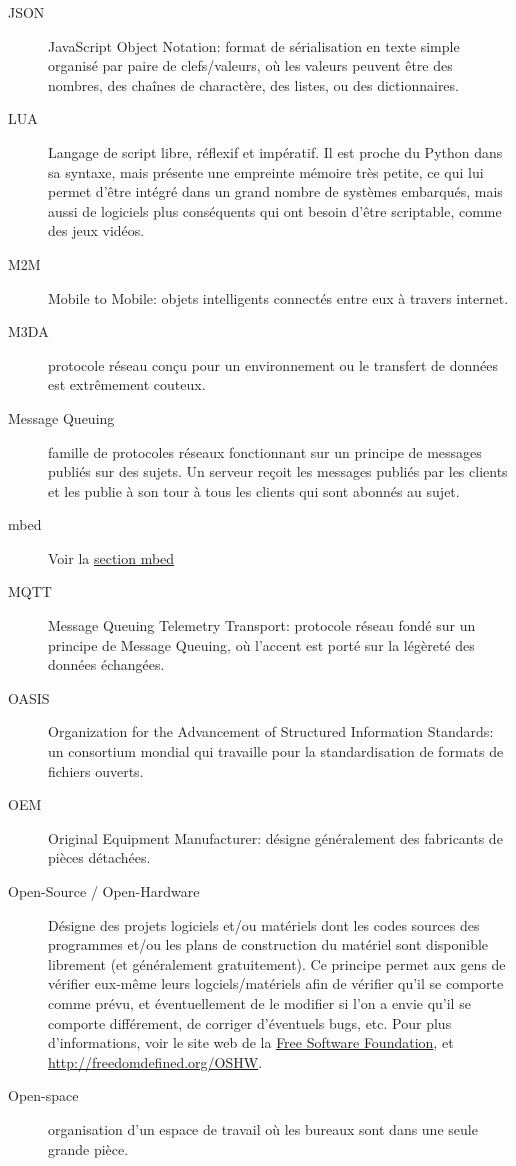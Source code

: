 \documentclass{article}
\begin{document}
\begin{description}
    \item[JSON] JavaScript Object Notation: format de sérialisation en texte simple organisé par paire de clefs/valeurs, où les valeurs peuvent être des nombres, des chaînes de charactère, des listes, ou des dictionnaires.
    \item[LUA] Langage de script libre, réflexif et impératif. Il est proche du Python dans sa syntaxe, mais présente une empreinte mémoire très petite, ce qui lui permet d’être intégré dans un grand nombre de systèmes embarqués, mais aussi de logiciels plus conséquents qui ont besoin d’être scriptable, comme des jeux vidéos.
    \item[M2M] Mobile to Mobile: objets intelligents connectés entre eux à travers internet.
    \item[M3DA] protocole réseau conçu pour un environnement ou le transfert de données est extrêmement couteux.
    \item[Message Queuing] famille de protocoles réseaux fonctionnant sur un principe de messages publiés sur des sujets. Un serveur reçoit les messages publiés par les clients et les publie à son tour à tous les clients qui sont abonnés au sujet.
    \item[mbed] Voir la \hyperref[mbed]{section mbed}
    \item[MQTT] Message Queuing Telemetry Transport: protocole réseau fondé sur un principe de Message Queuing, où l’accent est porté sur la légèreté des données échangées.
    \item[OASIS] Organization for the Advancement of Structured Information Standards: un consortium mondial qui travaille pour la standardisation de formats de fichiers ouverts.
    \item[OEM] Original Equipment Manufacturer: désigne généralement des fabricants de pièces détachées.
    \item[Open-Source / Open-Hardware] Désigne des projets logiciels et/ou matériels dont les codes sources des programmes et/ou les plans de construction du matériel sont disponible librement (et généralement gratuitement). Ce principe permet aux gens de vérifier eux-même leurs logciels/matériels afin de vérifier qu’il se comporte comme prévu, et éventuellement de le modifier si l’on a envie qu’il se comporte différement, de corriger d’éventuels bugs, etc. Pour plus d’informations, voir le site web de la \hyperref[https://www.fsf.org/]{Free Software Foundation}, et \hyperref[freedom defined]{http://freedomdefined.org/OSHW}.
    \item[Open-space] organisation d’un espace de travail où les bureaux sont dans une seule grande pièce.

\end{description}
\end{document}
